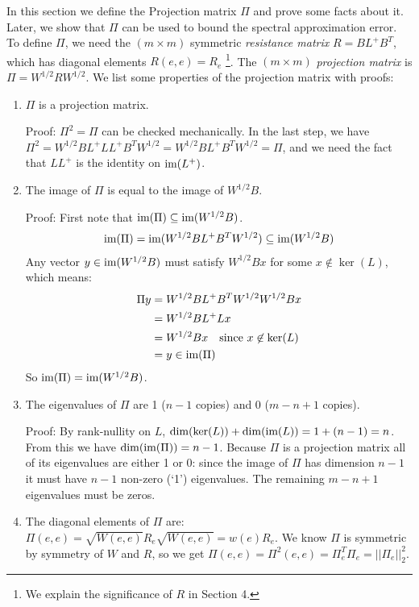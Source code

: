 \documentclass{article}
\begin{document}
In this section we define the Projection matrix $\Pi$ and prove some facts
about it. Later, we show that $\Pi$ can be used to bound the spectral
approximation error.  To define $\Pi$, we need the $(m \times m)$ symmetric
\textit{resistance matrix} $R = BL^+B^T$, which has diagonal elements $R(e,
e) = R_e$ \footnote{We explain the significance of $R$ in Section 4.}.  The
$(m \times m)$ \textit{projection matrix} is $\Pi = W^{1/2}RW^{1/2}$. We
list some properties of the projection matrix with proofs:
\begin{enumerate}[1.]
    \item $\Pi$ is a projection matrix.
        
        Proof: $\Pi^2 = \Pi$ can be checked mechanically. In the last step,
        we have $\Pi^2 = W^{1/2}BL^+LL^+B^TW^{1/2} = W^{1/2}BL^+B^TW^{1/2} =
        \Pi$, and we need the fact that $LL^+$ is the identity on
        $\text{im}(L^+)$.

    \item The image of $\Pi$ is equal to the image of $W^{1/2}B$.
        
        Proof: First note that $\text{im}(\Pi) \subseteq \text{im}(W^{1/2}B)$.
        \begin{align*}
            \text{im}(\Pi) = \text{im}(W^{1/2}BL^+B^TW^{1/2}) \subseteq \text{im}(W^{1/2}B)
        \end{align*}
        Any vector $y \in \text{im}(W^{1/2}B)$ must satisfy $W^{1/2}Bx$ for some
        $x \not\in \ker(L)$, which means:
        \begin{align*}
            \Pi y &= W^{1/2}BL^+B^TW^{1/2}W^{1/2}Bx \\
                  &= W^{1/2}BL^+Lx \\
                  &= W^{1/2}Bx \quad \text{since } x \not\in \ker(L) \\
                  &= y \in \text{im}(\Pi)
        \end{align*}
        So $\text{im}(\Pi) = \text{im}(W^{1/2}B)$.

    \item The eigenvalues of $\Pi$ are 1 ($n-1$ copies) and 0 ($m-n+1$
        copies).

        Proof: By rank-nullity on $L$, $\dim(\ker(L)) + \dim(\text{im}(L)) = 1 +
        (n-1) = n$. From this we have $\dim(\text{im}(\Pi)) = n-1$. Because $\Pi$
        is a projection matrix all of its eigenvalues are either 1 or 0:
        since the image of $\Pi$ has dimension $n-1$ it must have $n-1$
        non-zero (`1') eigenvalues. The remaining $m-n+1$ eigenvalues must
        be zeros.

    \item The diagonal elements of $\Pi$ are: $\Pi(e, e) = \sqrt{W(e,
        e)}R_e\sqrt{W(e, e)} = w(e)R_e$. We know $\Pi$ is symmetric by
        symmetry of $W$ and $R$, so we get $\Pi(e, e) = \Pi^2(e, e) =
        \Pi_e^T\Pi_e = ||\Pi_e||^2_2$.
\end{enumerate}
\end{document}
